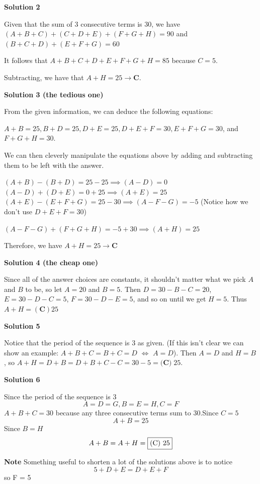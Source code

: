 \begin{enumerate}
\textbf{Solution 2}

Given that the sum of 3 consecutive terms is 30, we have$(A+B+C)+(C+D+E)+(F+G+H)=90$ and $(B+C+D)+(E+F+G)=60$

 It follows that $A+B+C+D+E+F+G+H=85$ because $C=5$.

 Subtracting, we have that $A+H=25\rightarrow \boxed{\textbf{C}}$.

 


 



\textbf{Solution 3 (the tedious one)}

From the given information, we can deduce the following equations:

 $A+B=25, B+D=25, D+E=25, D+E+F=30, E+F+G =30$, and $F+G+H=30$.

 We can then cleverly manipulate the equations above by adding and subtracting them to be left with the answer.

 $(A+B)-(B+D)=25-25 \implies (A-D)=0$
$(A-D)+(D+E)=0+25 \implies (A+E)=25$
$(A+E)-(E+F+G)=25-30 \implies (A-F-G)=-5$ (Notice how we don't use $D+E+F=30$)

 $(A-F-G)+(F+G+H)=-5+30 \implies (A+H)=25$

 Therefore, we have $A+H=25 \rightarrow \boxed{\textbf{C}}$




\textbf{Solution 4 (the cheap one)}

Since all of the answer choices are constants, it shouldn't matter what we pick $A$ and $B$ to be, so let $A = 20$ and $B = 5$. Then $D = 30 - B -C = 20$, $E = 30 - D - C = 5$, $F = 30 - D - E =5$, and so on until we get $H = 5$. Thus $A + H = \boxed{\mathbf{(C)}25}$




\textbf{Solution 5}

Notice that the period of the sequence is $3$ as given. (If this isn't clear we can show an example: $A+B+C=B+C=D$ $\Leftrightarrow$ $A=D$). Then $A=D$ and $H=B$, so $A+H=D+B=D+B+C-C=30-5=\boxed{\textbf{(C)}\;25}$.

 



\textbf{Solution 6}

Since the period of the sequence is $3$ 
 \[A=D=G, B=E=H, C=F\]$A+B+C=30$ because any three consecutive terms sum to $30$.Since $C=5$ 
 \[A+B=25\]Since $B=H$ 
 \[A+B=A+H=\fbox{(C) 25}\]

 \textbf{Note} Something useful to shorten a lot of the solutions above is to notice 
 \[5 + D + E = D + E + F\] so F = 5


\end{enumerate}
